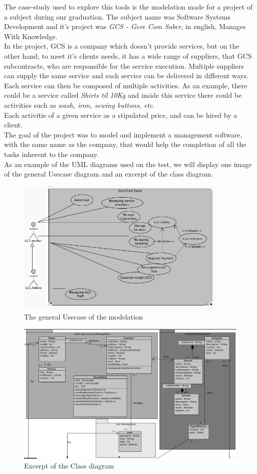 The case-study used to explore this tools is the modelation made for a project of a subject during our graduation. The subject name was Software Systems Development and it's project was \textit{GCS - Gere Com Saber}, in english, Manages With Knowledge.\\
In the project, GCS is a company which doesn't provide services, but on the other hand, to meet it's clients needs, it has a wide range of suppliers, that GCS subcontracts, who are responsible for the service execution. Multiple suppliers can supply the same service and each  service can be delivered in different ways. Each service can then be composed of multiple activities. As an example, there could be a service called \textit{Shirts til 10Kg} and inside this service there could be activities such as \textit{wash, iron, sewing buttons, etc}.\\
Each activitie of a given service as a stipulated price, and can be hired by a client.\\
The goal of the project was to model and implement a management software, with the same name as the company, that would help the completion of all the tasks inherent to the company.\\

As an example of the UML diagrams used on the test, we will display one image of the general Usecase diagram and an excerpt of the class diagram.

\begin{figure}[H]
\begin{center}
\includegraphics[width=0.9\textwidth]{images/usecase.png}
\caption{The general Usecase of the modelation}\label{img:usecase}
\end{center}
\end{figure} 

\begin{figure}[H]
\begin{center}
\includegraphics[scale=0.35]{images/classbw.png}
\caption{Excerpt of the Class diagram}\label{img:usecase}
\end{center}
\end{figure} 
